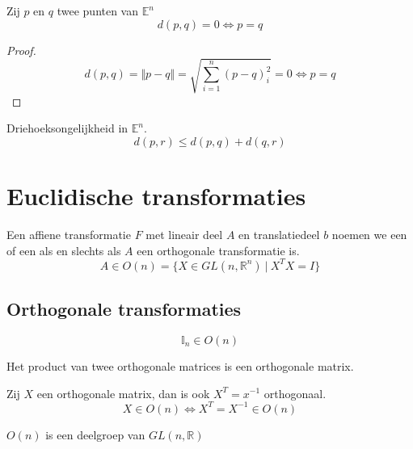 \documentclass[main.tex]{subfiles}
\begin{document}
\begin{ei}
  \label{ei:afstand-nul-gelijk}
  Zij $p$ en $q$ twee punten van $\mathbb{E}^{n}$
  \[ d(p,q) = 0 \Leftrightarrow p = q \]

  \begin{proof}
    \[ d(p,q) = \Vert p-q \Vert = \sqrt{\sum_{i=1}^{n}(p-q)^{2}_{i}} = 0 \Leftrightarrow p = q \]
  \end{proof}
\end{ei}

\begin{ei}
  \label{ei:driehoeksongelijkheid-in-En}
  Driehoeksongelijkheid in $\mathbb{E}^{n}$.
  \[ d(p,r) \le d(p,q) + d(q,r) \]
\end{ei}

\section{Euclidische transformaties}
\label{sec:eucl-transf}

\begin{de}
  \label{de:euclidische-transformatie}
  Een affiene transformatie $F$ met lineair deel $A$ en translatiedeel $b$ noemen we een  of een  als en slechts als $A$ een orthogonale transformatie is.
  \[ A \in O(n) = \{ X \in GL(n,\mathbb{R}^{n}) \ |\ X^{T}X = I \} \]
\end{de}

\subsection{Orthogonale transformaties}
\label{sec:orth-transf}

\begin{st}
  \[ \mathbb{I}_{n} \in O(n) \] 
\end{st}

\begin{st}
  Het product van twee orthogonale matrices is een orthogonale matrix.
\end{st}

\begin{st}
  Zij $X$ een orthogonale matrix, dan is ook $X^{T}=x^{-1}$ orthogonaal.
  \[ X \in O(n) \Leftrightarrow X^{T} = X^{-1} \in O(n)\]
\end{st}

\begin{st}
  $O(n)$ is een deelgroep van $GL(n,\mathbb{R})$
\end{st}
\end{document}

